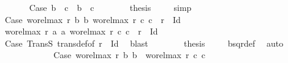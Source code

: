 \begin{isabellebody}
\ \ \ \ \ \isacommand{{\isacharbraceleft}{\kern0pt}}\isamarkupfalse%
\isamarkupfalse%
\ Case{}{}{\isacharcolon}{\kern0pt}\ {\isachardoublequoteopen}b{}\ {\isacharequal}{\kern0pt}\ c{}\ {\isasymand}\ b{}\ {\isacharequal}{\kern0pt}\ c{}{\isachardoublequoteclose}\isanewline
\ \ \ \ \ \ \isamarkupfalse%
\ {\isacharquery}{\kern0pt}thesis\ \isamarkupfalse%
\ {\isacharasterisk}{\kern0pt}\ \isamarkupfalse%
\ simp\isanewline
\ \ \ \ \ \isacommand{{\isacharbraceright}{\kern0pt}}\isamarkupfalse%
\isanewline
\ \ \ \ \ \isamarkupfalse%
\isanewline
\ \ \ \ \ \isacommand{{\isacharbraceleft}{\kern0pt}}\isamarkupfalse%
\isamarkupfalse%
\ Case{}{}{\isacharcolon}{\kern0pt}\ {\isachardoublequoteopen}{\isacharparenleft}{\kern0pt}wo{\isacharunderscore}{\kern0pt}rel{\isachardot}{\kern0pt}max{}\ r\ b{}\ b{}{\isacharcomma}{\kern0pt}\ wo{\isacharunderscore}{\kern0pt}rel{\isachardot}{\kern0pt}max{}\ r\ c{}\ c{}{\isacharparenright}{\kern0pt}\ {\isasymin}\ r\ {\isacharminus}{\kern0pt}\ Id{\isachardoublequoteclose}\isanewline
\ \ \ \ \ \ \isamarkupfalse%
\ {\isachardoublequoteopen}{\isacharparenleft}{\kern0pt}wo{\isacharunderscore}{\kern0pt}rel{\isachardot}{\kern0pt}max{}\ r\ a{}\ a{}{\isacharcomma}{\kern0pt}\ wo{\isacharunderscore}{\kern0pt}rel{\isachardot}{\kern0pt}max{}\ r\ c{}\ c{}{\isacharparenright}{\kern0pt}\ {\isasymin}\ r\ {\isacharminus}{\kern0pt}\ Id{\isachardoublequoteclose}\isanewline
\ \ \ \ \ \ \isamarkupfalse%
\ Case{}\ TransS\ trans{\isacharunderscore}{\kern0pt}def{\isacharbrackleft}{\kern0pt}of\ {\isachardoublequoteopen}r\ {\isacharminus}{\kern0pt}\ Id{\isachardoublequoteclose}{\isacharbrackright}{\kern0pt}\ \isamarkupfalse%
\ blast\isanewline
\ \ \ \ \ \ \isamarkupfalse%
\ {\isacharquery}{\kern0pt}thesis\ \isamarkupfalse%
\ {}\ \isamarkupfalse%
\ bsqr{\isacharunderscore}{\kern0pt}def\ \isamarkupfalse%
\ auto\isanewline
\ \ \ \ \ \isacommand{{\isacharbraceright}{\kern0pt}}\isamarkupfalse%
\isanewline
\ \ \ \ \ \isamarkupfalse%
\isanewline
\ \ \ \ \ \isacommand{{\isacharbraceleft}{\kern0pt}}\isamarkupfalse%
\isamarkupfalse%
\ Case{}{}{\isacharunderscore}{\kern0pt}{}{\isacharcolon}{\kern0pt}\ {\isachardoublequoteopen}wo{\isacharunderscore}{\kern0pt}rel{\isachardot}{\kern0pt}max{}\ r\ b{}\ b{}\ {\isacharequal}{\kern0pt}\ wo{\isacharunderscore}{\kern0pt}rel{\isachardot}{\kern0pt}max{}\ r\ c{}\ c{}{\isachardoublequoteclose}\isanewline

\end{isabellebody}
